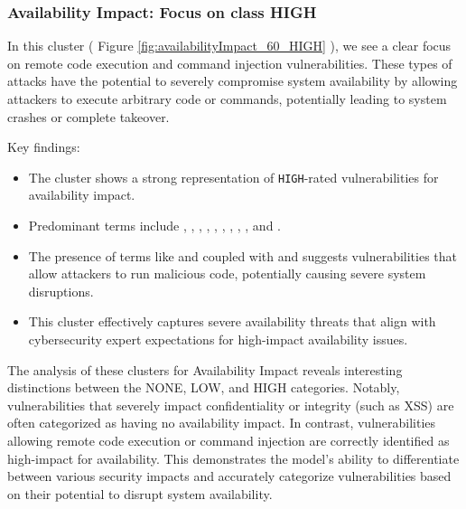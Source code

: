 \documentclass[12pt]{article}
\begin{document}
\subsubsection{Availability Impact: Focus on class HIGH}


In this cluster ( Figure \ref{fig:availabilityImpact_60_HIGH} ), we see a clear focus on remote code
execution and command injection vulnerabilities. These types of attacks have the potential to
severely compromise system availability by allowing attackers to execute arbitrary code or commands,
potentially leading to system crashes or complete takeover.

Key findings:

\begin{itemize}

	\item The cluster shows a strong representation of \texttt{HIGH}-rated vulnerabilities for
	      availability impact.

	\item Predominant terms include , , ,
	      , ,
	      , , , , and .

	\item The presence of terms like  and  coupled with  and 
	      suggests vulnerabilities that allow attackers to run malicious code, potentially causing
	      severe system disruptions.

	\item This cluster effectively captures severe availability threats that align with
	      cybersecurity expert expectations for high-impact availability issues.

\end{itemize}

The analysis of these clusters for Availability Impact reveals interesting distinctions between the
NONE, LOW, and HIGH categories. Notably, vulnerabilities that severely impact confidentiality or
integrity (such as XSS) are often categorized as having no availability impact. In contrast,
vulnerabilities allowing remote code execution or command injection are correctly identified as
high-impact for availability. This demonstrates the model's ability to differentiate between various
security impacts and accurately categorize vulnerabilities based on their potential to disrupt
system availability.
\end{document}
